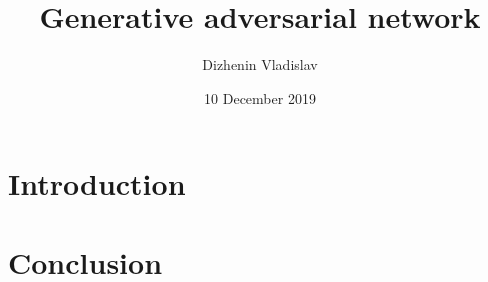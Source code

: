 \documentclass{article}
\title{Generative adversarial network}
\author{Dizhenin Vladislav}
\date{10 December 2019}
\begin{document}
\maketitle

\section{Introduction}


\begin{figure}[h!]
\centering
\caption{}
\label{}
\end{figure}

\section{Conclusion}
 \citep{adams1995hitchhiker}



\end{document}
